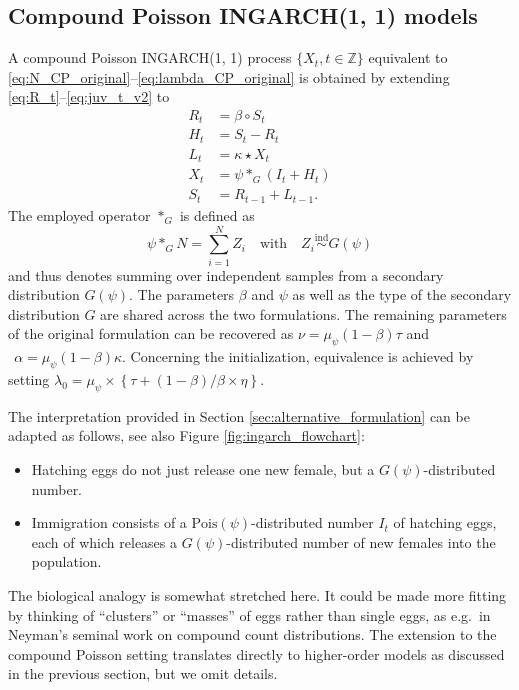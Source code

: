 \documentclass{article}
\begin{document}
\subsection{Compound Poisson INGARCH(1, 1) models}

A compound Poisson INGARCH(1, 1) process $\{X_t, t \in \mathbb{Z}\}$ equivalent to \eqref{eq:N_CP_original}--\eqref{eq:lambda_CP_original} is obtained by extending \eqref{eq:R_t}--\eqref{eq:juv_t_v2} to
\begin{align}
R_t & = \beta \circ S_t \label{eq:R_t_CP}\\
H_t & = S_t - R_t \label{eq:H_t_CP}\\
L_t & = \kappa \star X_t \label{eq:L_t_CP}\\
X_t & = \psi *_G (I_t + H_t)\label{eq:X_t_CP} \\
S_t & = R_{t - 1} + L_{t - 1}.\label{eq:juv_t_CP}
\end{align}
The employed operator $*_G$ is defined as
$$
\psi *_G N = \sum_{i = 1}^N Z_i \ \ \ \text{ with } \ \ \ Z_i \stackrel{\text{ind}}{\sim} G(\psi)
$$
and thus denotes summing over independent samples from a secondary distribution $G(\psi)$. The parameters $\beta$ and $\psi$ as well as the type of the secondary distribution $G$ are shared across the two formulations. The remaining parameters of the original formulation can be recovered as
$
\nu = \mu_\psi(1 - \beta)\tau$ and $ \ \
\alpha = \mu_\psi(1 - \beta)\kappa.
$
Concerning the initialization, equivalence is achieved by setting $\lambda_0 = \mu_\psi\times \left\{\tau + (1 - \beta)/\beta \times \eta\right\}$.

The interpretation provided in Section \ref{sec:alternative_formulation} can be adapted as follows, see also Figure \ref{fig:ingarch_flowchart}:
\begin{itemize}
\item Hatching eggs do not just release one new female, but a $G(\psi)$-distributed number.
\item Immigration consists of a $\text{Pois}(\psi)$-distributed number $I_t$ of hatching eggs, each of which releases a $G(\psi)$-distributed number of new females into the population.
\end{itemize}
The biological analogy is somewhat stretched here. It could be made more fitting by thinking of ``clusters'' or ``masses'' of eggs rather than single eggs, as e.g.\ in Neyman's \cite{Neyman1939} seminal work on compound count distributions. The extension to the compound Poisson setting translates directly to higher-order models as discussed in the previous section, but we omit details.
\end{document}
